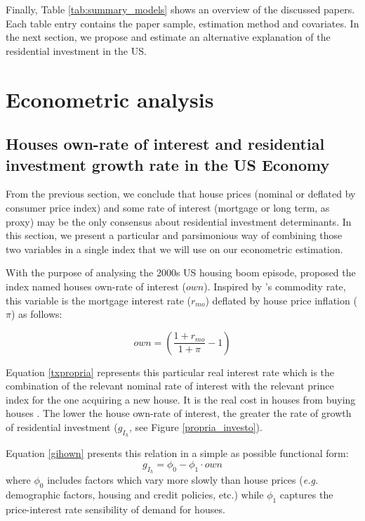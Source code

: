 \documentclass[12pt, a4paper]{article}
\begin{document}
Finally, Table \ref{tab:summary_models} shows an overview of the discussed papers.
Each table entry contains the paper sample, estimation method and covariates.
In the next section, we propose and estimate an alternative explanation of the residential investment in the US.




\section{Econometric analysis}
\label{sec:org38b4694}
\label{sec:VECM}
\subsection{Houses own-rate of interest and residential investment growth rate in the US Economy}
\label{sec:org7eb1a91}
\label{sc:own}

From the previous section, we conclude that house prices (nominal or deflated by consumer price index) and some rate of interest (mortgage or long term, as proxy) may be the only consensus about residential investment determinants.
In this section, we present a particular and parsimonious way of combining those two variables  in a single index that we will use on our econometric estimation.


With the purpose of analysing the 2000s US housing boom episode, \textcite{teixeira_crescimento_2015}  proposed the index named houses own-rate of interest (\(own\)).
Inspired by \citeauthor*{sraffaDrHayekMoney1932}'s \citeyear{sraffaDrHayekMoney1932} commodity rate, this variable is the mortgage interest rate (\(r_{mo}\)) deflated by house price inflation (\(\pi\)) as follows:
\begin{latex}
\begin{equation}
\label{txpropria}
own =  \left(\frac{1+r_{mo}}{1+\pi} - 1\right)
\end{equation}
\end{latex}
Equation \ref{txpropria} represents this particular real interest rate which is the combination of the relevant nominal rate of interest with the relevant prince index for the one acquiring a new house.
It is the real cost in houses from buying houses  \cite[p.~53]{teixeira_crescimento_2015}.
The lower the house own-rate of interest, the greater the rate of growth of residential investment (\(g_{I_{h}}\), see Figure \ref{propria_investo}).

Equation \ref{gihown} presents this relation in a simple as possible functional form:
\begin{equation}
\label{gihown}
g_{I_h} = \phi_0 - \phi_1\cdot own
\end{equation}
where \(\phi_0\) includes factors which vary more slowly than house prices (\emph{e.g.} demographic factors, housing and credit policies, etc.) while \(\phi_1\) captures the price-interest rate sensibility of demand for houses.
\end{document}
